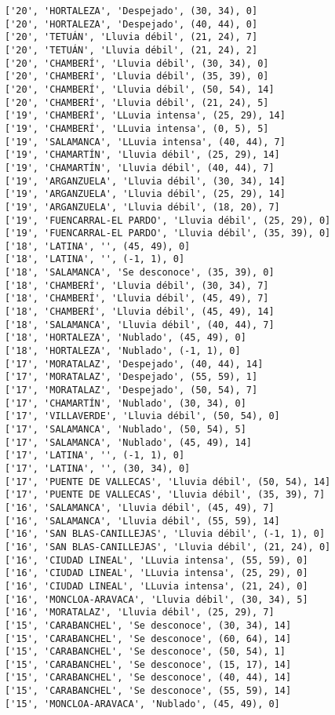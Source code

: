 \documentclass[11pt]{article}
\begin{document}
\begin{Verbatim}[commandchars=\\\{\}]
['20', 'HORTALEZA', 'Despejado', (30, 34), 0]
['20', 'HORTALEZA', 'Despejado', (40, 44), 0]
['20', 'TETUÁN', 'Lluvia débil', (21, 24), 7]
['20', 'TETUÁN', 'Lluvia débil', (21, 24), 2]
['20', 'CHAMBERÍ', 'Lluvia débil', (30, 34), 0]
['20', 'CHAMBERÍ', 'Lluvia débil', (35, 39), 0]
['20', 'CHAMBERÍ', 'Lluvia débil', (50, 54), 14]
['20', 'CHAMBERÍ', 'Lluvia débil', (21, 24), 5]
['19', 'CHAMBERÍ', 'LLuvia intensa', (25, 29), 14]
['19', 'CHAMBERÍ', 'LLuvia intensa', (0, 5), 5]
['19', 'SALAMANCA', 'LLuvia intensa', (40, 44), 7]
['19', 'CHAMARTÍN', 'Lluvia débil', (25, 29), 14]
['19', 'CHAMARTÍN', 'Lluvia débil', (40, 44), 7]
['19', 'ARGANZUELA', 'Lluvia débil', (30, 34), 14]
['19', 'ARGANZUELA', 'Lluvia débil', (25, 29), 14]
['19', 'ARGANZUELA', 'Lluvia débil', (18, 20), 7]
['19', 'FUENCARRAL-EL PARDO', 'Lluvia débil', (25, 29), 0]
['19', 'FUENCARRAL-EL PARDO', 'Lluvia débil', (35, 39), 0]
['18', 'LATINA', '', (45, 49), 0]
['18', 'LATINA', '', (-1, 1), 0]
['18', 'SALAMANCA', 'Se desconoce', (35, 39), 0]
['18', 'CHAMBERÍ', 'Lluvia débil', (30, 34), 7]
['18', 'CHAMBERÍ', 'Lluvia débil', (45, 49), 7]
['18', 'CHAMBERÍ', 'Lluvia débil', (45, 49), 14]
['18', 'SALAMANCA', 'Lluvia débil', (40, 44), 7]
['18', 'HORTALEZA', 'Nublado', (45, 49), 0]
['18', 'HORTALEZA', 'Nublado', (-1, 1), 0]
['17', 'MORATALAZ', 'Despejado', (40, 44), 14]
['17', 'MORATALAZ', 'Despejado', (55, 59), 1]
['17', 'MORATALAZ', 'Despejado', (50, 54), 7]
['17', 'CHAMARTÍN', 'Nublado', (30, 34), 0]
['17', 'VILLAVERDE', 'Lluvia débil', (50, 54), 0]
['17', 'SALAMANCA', 'Nublado', (50, 54), 5]
['17', 'SALAMANCA', 'Nublado', (45, 49), 14]
['17', 'LATINA', '', (-1, 1), 0]
['17', 'LATINA', '', (30, 34), 0]
['17', 'PUENTE DE VALLECAS', 'Lluvia débil', (50, 54), 14]
['17', 'PUENTE DE VALLECAS', 'Lluvia débil', (35, 39), 7]
['16', 'SALAMANCA', 'Lluvia débil', (45, 49), 7]
['16', 'SALAMANCA', 'Lluvia débil', (55, 59), 14]
['16', 'SAN BLAS-CANILLEJAS', 'Lluvia débil', (-1, 1), 0]
['16', 'SAN BLAS-CANILLEJAS', 'Lluvia débil', (21, 24), 0]
['16', 'CIUDAD LINEAL', 'LLuvia intensa', (55, 59), 0]
['16', 'CIUDAD LINEAL', 'LLuvia intensa', (25, 29), 0]
['16', 'CIUDAD LINEAL', 'LLuvia intensa', (21, 24), 0]
['16', 'MONCLOA-ARAVACA', 'Lluvia débil', (30, 34), 5]
['16', 'MORATALAZ', 'Lluvia débil', (25, 29), 7]
['15', 'CARABANCHEL', 'Se desconoce', (30, 34), 14]
['15', 'CARABANCHEL', 'Se desconoce', (60, 64), 14]
['15', 'CARABANCHEL', 'Se desconoce', (50, 54), 1]
['15', 'CARABANCHEL', 'Se desconoce', (15, 17), 14]
['15', 'CARABANCHEL', 'Se desconoce', (40, 44), 14]
['15', 'CARABANCHEL', 'Se desconoce', (55, 59), 14]
['15', 'MONCLOA-ARAVACA', 'Nublado', (45, 49), 0]

\end{Verbatim}
\end{document}
